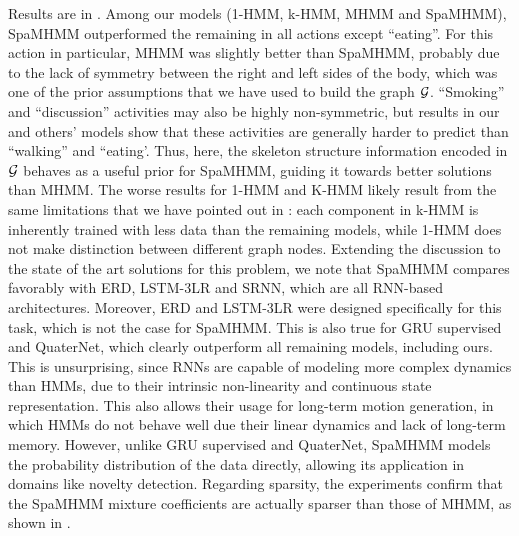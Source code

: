 Results are in . Among our models (1-HMM, k-HMM, MHMM and SpaMHMM), SpaMHMM outperformed the remaining in all actions except ``eating''. For this action in particular, MHMM was slightly better than SpaMHMM, probably due to the lack of symmetry between the right and left sides of the body, which was one of the prior assumptions that we have used to build the graph ${\mathcal{G}}$. ``Smoking'' and ``discussion'' activities may also be highly non-symmetric, but results in our and others' models show that these activities are generally harder to predict than ``walking'' and ``eating'. Thus, here, the skeleton structure information encoded in ${\mathcal{G}}$ behaves as a useful prior for SpaMHMM, guiding it towards better solutions than MHMM. The worse results for 1-HMM and K-HMM likely result from the same limitations that we have pointed out in : each component in k-HMM is inherently trained with less data than the remaining models, while 1-HMM does not make distinction between different graph nodes. Extending the discussion to the state of the art solutions for this problem, we note that SpaMHMM compares favorably with ERD, LSTM-3LR and SRNN, which are all RNN-based architectures. Moreover, ERD and LSTM-3LR were designed specifically for this task, which is not the case for SpaMHMM. This is also true for GRU supervised and QuaterNet, which clearly outperform all remaining models, including ours. This is unsurprising, since RNNs are capable of modeling more complex dynamics than HMMs, due to their intrinsic non-linearity and continuous state representation. This also allows their usage for long-term motion generation, in which HMMs do not behave well due their linear dynamics and lack of long-term memory. However, unlike GRU supervised and QuaterNet, SpaMHMM  models the probability distribution of the data directly, allowing its application in domains like novelty detection. Regarding sparsity, the experiments confirm that the SpaMHMM mixture coefficients are actually sparser than those of MHMM, as shown in .

